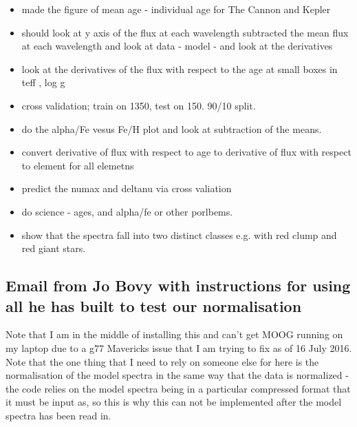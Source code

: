 \documentclass[11pt]{amsart}
\begin{document}
\begin{itemize}
\item made the figure of mean age - individual age for The Cannon and Kepler
\item should look at y axis of the flux at each wavelength subtracted the mean flux at each wavelength and look at data  - model - and look at the derivatives
\end{itemize} 

\begin{itemize}
\item look at the derivatives of the flux with respect to the age at small boxes in teff , log g
\item cross validation; train on 1350, test on 150. 90/10 split.
\item do the alpha/Fe vesus Fe/H plot and look at subtraction of the means.
\item convert derivative of flux with respect to age to derivative of flux with respect to element for all elemetns
\item predict the numax and deltanu via cross valiation
\item do science - ages, and alpha/fe or other porlbems. 
\item show that the spectra fall into two distinct classes e.g. with red clump and red giant stars. 
\end{itemize} 



\pagebreak

\subsection{Email from Jo Bovy with instructions for using all he has built to test our normalisation} 
\vspace{20pt}

Note that I am in the middle of installing this and can't get MOOG running on my laptop due to a g77 Mavericks issue that I am trying to fix as of 16 July 2016.\\

Note that the one thing that I need to rely on someone else for here is the normalisation of the model spectra in the same way that the data is normalized - the code relies on the model spectra being in a particular compressed format that it must be input as, so this is why this can not be implemented after the model spectra has been read in. \\
\end{document}
